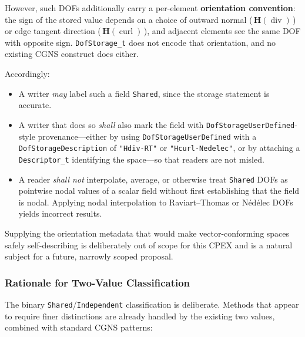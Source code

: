 \documentclass[11pt,letterpaper]{article}
\begin{document}
However, such DOFs additionally carry a per-element \textbf{orientation
convention}: the sign of the stored value depends on a choice of outward
normal (\,$\boldsymbol{H}(\operatorname{div})$\,) or edge tangent direction
(\,$\boldsymbol{H}(\operatorname{curl})$\,), and adjacent elements see the same
DOF with opposite sign.  \texttt{DofStorage\_t} does not encode that
orientation, and no existing CGNS construct does either.

Accordingly:

\begin{itemize}[leftmargin=2em]
\item A writer \emph{may} label such a field \texttt{Shared}, since the
  storage statement is accurate.
\item A writer that does so \emph{shall} also mark the field with
  \texttt{DofStorageUserDefined}-style provenance---either by using
  \texttt{DofStorageUserDefined} with a
  \texttt{DofStorageDescription} of \texttt{"Hdiv-RT"} or
  \texttt{"Hcurl-Nedelec"}, or by attaching a
  \texttt{Descriptor\_t} identifying the space---so that readers are not
  misled.
\item A reader \emph{shall not} interpolate, average, or otherwise treat
  \texttt{Shared} DOFs as pointwise nodal values of a scalar field
  without first establishing that the field is nodal.  Applying nodal
  interpolation to Raviart--Thomas or N\'{e}d\'{e}lec DOFs yields
  incorrect results.
\end{itemize}

Supplying the orientation metadata that would make vector-conforming
spaces safely self-describing is deliberately out of scope for this
CPEX and is a natural subject for a future, narrowly scoped proposal.

\subsubsection{Rationale for Two-Value Classification}

The binary \texttt{Shared}/\texttt{Independent} classification is
deliberate.  Methods that appear to require finer distinctions are
already handled by the existing two values, combined with standard
CGNS patterns:
\end{document}
